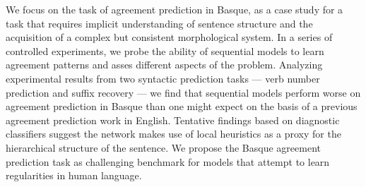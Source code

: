 We focus on the task of agreement prediction in Basque, as a case study for a task that requires implicit understanding of sentence structure and the acquisition of a complex but consistent morphological system. In a series of controlled experiments, we probe the ability of sequential models to learn agreement patterns and asses different aspects of the problem. Analyzing experimental results from two syntactic prediction tasks --- verb number prediction and suffix recovery --- we find that sequential models perform worse on agreement prediction in Basque than one might expect on the basis of a previous agreement prediction work in English. Tentative findings based on diagnostic classifiers suggest the network makes use of local heuristics as a proxy for the hierarchical structure of the sentence. We propose the Basque agreement prediction task as challenging benchmark for models that attempt to learn regularities in human language.
